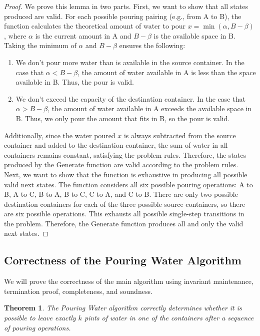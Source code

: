\documentclass{article}
\newtheorem{theorem}{Theorem}
\begin{document}
\begin{proof}
We prove this lemma in two parts.
First, we want to show that all states produced are valid.
For each possible pouring pairing (e.g., from A to B), the function calculates the theoretical amount of water to pour $x = \min(\alpha, B - \beta)$, where $\alpha$ is the current amount in A and $B - \beta$ is the available space in B. 
Taking the minimum of $\alpha$ and $B - \beta$ ensures the following:

\begin{enumerate}
    \item We don't pour more water than is available in the source container.
    In the case that $\alpha < B - \beta$, the amount of water available in A is less than the space available in B. 
    Thus, the pour is valid.
    \item We don't exceed the capacity of the destination container.
    In the case that $\alpha > B - \beta$, the amount of water available in A exceeds the available space in B.
    Thus, we only pour the amount that fits in B, so the pour is valid.
\end{enumerate}

Additionally, since the water poured $x$ is always subtracted from the source container and added to the destination container, the sum of water in all containers remains constant, satisfying the problem rules.
Therefore, the states produced by the Generate function are valid according to the problem rules.
Next, we want to show that the function is exhaustive in producing all possible valid next states.
The function considers all six possible pouring operations: A to B, A to C, B to A, B to C, C to A, and C to B.
There are only two possible destination containers for each of the three possible source containers, so there are six possible operations.
This exhausts all possible single-step transitions in the problem.
Therefore, the Generate function produces all and only the valid next states.
\end{proof}

\subsection{Correctness of the Pouring Water Algorithm}

We will prove the correctness of the main algorithm using invariant maintenance, termination proof, completeness, and soundness.

\begin{theorem}
The Pouring Water algorithm correctly determines whether it is possible to leave exactly $k$ pints of water in one of the containers after a sequence of pouring operations.
\end{theorem}
\end{document}
